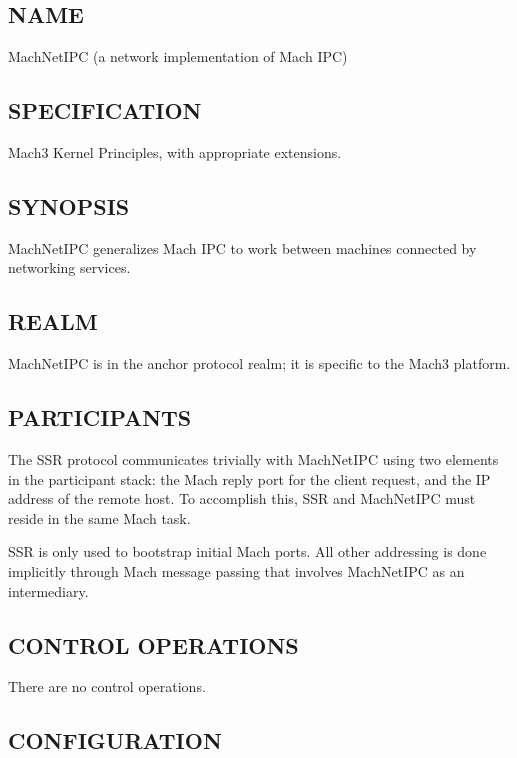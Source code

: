 %
%
%

\subsection*{NAME}

\noindent MachNetIPC (a network implementation of Mach IPC)

\subsection*{SPECIFICATION}

Mach3 Kernel Principles, with appropriate extensions.

\subsection*{SYNOPSIS}

\noindent MachNetIPC generalizes Mach IPC to work between machines
connected by networking services.

\subsection*{REALM}

MachNetIPC is in the anchor protocol realm; it is specific to the Mach3
platform.

\subsection*{PARTICIPANTS}

The SSR protocol communicates trivially with MachNetIPC using
two elements in the participant stack: the Mach reply port for
the client request, and the IP address of the remote host.  To
accomplish this, SSR and MachNetIPC must reside in the same Mach task.

SSR is only used to bootstrap initial Mach ports.  All other addressing
is done implicitly through Mach message passing that involves MachNetIPC
as an intermediary.

\subsection*{CONTROL OPERATIONS}

There are no control operations.

\subsection*{CONFIGURATION}

